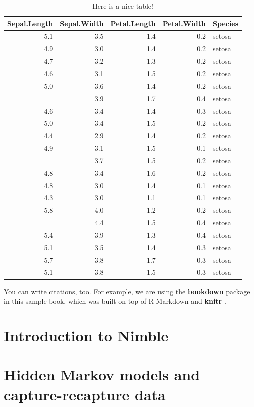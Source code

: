 \documentclass[
  12pt,
]{krantz}
\begin{document}
\begin{table}

\caption{\label{tab:nice-tab}Here is a nice table!}
\centering
\begin{tabular}[t]{rrrrl}
\toprule
Sepal.Length & Sepal.Width & Petal.Length & Petal.Width & Species\\
\midrule
5.1 & 3.5 & 1.4 & 0.2 & setosa\\
4.9 & 3.0 & 1.4 & 0.2 & setosa\\
4.7 & 3.2 & 1.3 & 0.2 & setosa\\
4.6 & 3.1 & 1.5 & 0.2 & setosa\\
5.0 & 3.6 & 1.4 & 0.2 & setosa\\
\addlinespace
5.4 & 3.9 & 1.7 & 0.4 & setosa\\
4.6 & 3.4 & 1.4 & 0.3 & setosa\\
5.0 & 3.4 & 1.5 & 0.2 & setosa\\
4.4 & 2.9 & 1.4 & 0.2 & setosa\\
4.9 & 3.1 & 1.5 & 0.1 & setosa\\
\addlinespace
5.4 & 3.7 & 1.5 & 0.2 & setosa\\
4.8 & 3.4 & 1.6 & 0.2 & setosa\\
4.8 & 3.0 & 1.4 & 0.1 & setosa\\
4.3 & 3.0 & 1.1 & 0.1 & setosa\\
5.8 & 4.0 & 1.2 & 0.2 & setosa\\
\addlinespace
5.7 & 4.4 & 1.5 & 0.4 & setosa\\
5.4 & 3.9 & 1.3 & 0.4 & setosa\\
5.1 & 3.5 & 1.4 & 0.3 & setosa\\
5.7 & 3.8 & 1.7 & 0.3 & setosa\\
5.1 & 3.8 & 1.5 & 0.3 & setosa\\
\bottomrule
\end{tabular}
\end{table}

You can write citations, too. For example, we are using the \textbf{bookdown} package \citep{R-bookdown} in this sample book, which was built on top of R Markdown and \textbf{knitr} \citep{xie2015}.

\hypertarget{intronimble}{%
\chapter{Introduction to Nimble}\label{intronimble}}

\hypertarget{hmmcapturerecapture}{%
\chapter{Hidden Markov models and capture-recapture data}\label{hmmcapturerecapture}}
\end{document}
